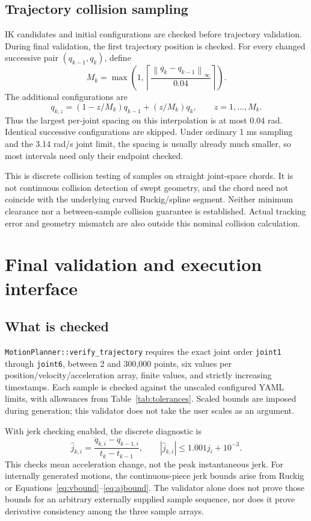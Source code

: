 \documentclass[11pt,a4paper]{report}
\newcommand{\file}[1]{\nolinkurl{#1}}
\newcommand{\norm}[1]{\left\lVert#1\right\rVert}
\begin{document}
\subsection{Trajectory collision sampling}
IK candidates and initial configurations are checked before trajectory
validation. During final validation, the first trajectory position is checked.
For every changed successive pair $(q_{k-1},q_k)$, define
\begin{equation}
 M_k=\max\left(1,\left\lceil
 \frac{\norm{q_k-q_{k-1}}_\infty}{0.04}\right\rceil\right).
\end{equation}
The additional configurations are
\begin{equation}
 q_{k,z}=(1-z/M_k)q_{k-1}+(z/M_k)q_k,\qquad z=1,\ldots,M_k.
\end{equation}
Thus the largest per-joint spacing on this interpolation is at most $0.04$
rad. Identical successive configurations are skipped. Under ordinary 1 ms
sampling and the 3.14 rad/s joint limit, the spacing is usually already much
smaller, so most intervals need only their endpoint checked.

This is discrete collision testing of samples on straight joint-space
chords. It is not continuous collision detection of swept geometry, and the
chord need not coincide with the underlying curved Ruckig/spline segment.
Neither minimum clearance nor a between-sample collision guarantee is
established. Actual tracking error and geometry mismatch are also outside
this nominal collision calculation.

\section{Final validation and execution interface}
\subsection{What is checked}
\file{MotionPlanner::verify_trajectory} requires the exact joint order
\file{joint1} through \file{joint6}, between 2 and 300,000 points, six values
per position/velocity/acceleration array, finite values, and strictly
increasing timestamps. Each sample is checked against the unscaled configured
YAML limits, with allowances from Table~\ref{tab:tolerances}. Scaled bounds
are imposed during generation; this validator does not take the user scales
as an argument.

With jerk checking enabled, the discrete diagnostic is
\begin{equation}
 \widehat j_{k,i}=
 \frac{\ddot q_{k,i}-\ddot q_{k-1,i}}{t_k-t_{k-1}},\qquad
 |\widehat j_{k,i}|\le1.001j_i+10^{-3}.
\end{equation}
This checks mean acceleration change, not the peak instantaneous jerk.
For internally generated motions, the continuous-piece jerk bounds arise
from Ruckig or Equations~\eqref{eq:vbound}--\eqref{eq:ajbound}. The validator
alone does not prove those bounds for an arbitrary externally supplied
sample sequence, nor does it prove derivative consistency among the three
sample arrays.
\end{document}
